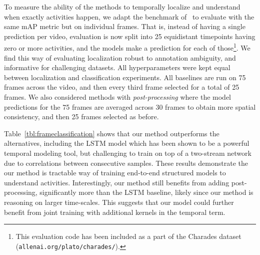 \documentclass[10pt,twocolumn,letterpaper]{article}
\newcommand{\myurl}[1]{\texttt{#1}}
\begin{document}
To measure the ability of the methods to temporally localize and understand when exactly activities happen, we adapt the benchmark of~\cite{charades} to evaluate with the same mAP metric but on individual frames. That is, instead of having a single prediction per video, evaluation is now split into 25 equidistant timepoints having zero or more activities, and the models make a prediction for each of those\footnote{This evaluation code has been included as a part of the Charades dataset (\myurl{allenai.org/plato/charades/}).}.
We find this way of evaluating localization robust to annotation ambiguity, and informative for challenging datasets.
All hyperparameters were kept equal between localization and classification experiments. All baselines are run on 75 frames across the video, and then every third frame selected for a total of 25 frames. We also considered methods with \emph{post-processing} where the model predictions for the 75 frames are averaged across 30 frames to obtain more spatial consistency, and then 25 frames selected as before.
\begin{table}[tb]
\begin{center}
\setlength{\tabcolsep}{8pt}
\end{center}
\caption{Temporal localization results (mAP \%) on the Charades~\cite{charades} dataset. Our proposed method outperforms the LSTM model, and is also more tractable to train at a large-scale.}
\label{tbl:frameclassification}
\end{table}

Table~\ref{tbl:frameclassification} shows that our method outperforms the alternatives, including the LSTM model which has been shown to be a powerful temporal modeling tool, but challenging to train on top of a two-stream network due to correlations between consecutive samples. These results demonstrate the our method is tractable way of training end-to-end structured models to understand activities. Interestingly, our method still benefits from adding post-processing, significantly more than the LSTM baseline, likely since our method is reasoning on larger time-scales. This suggests that our model could further benefit from joint training with additional kernels in the temporal term.
\end{document}
